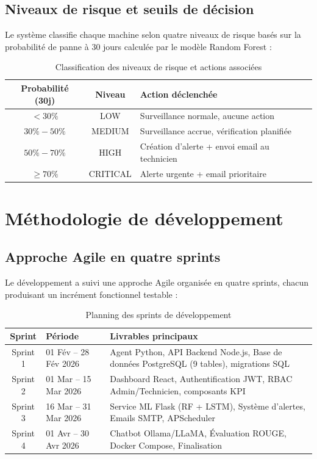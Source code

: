 \subsection{Niveaux de risque et seuils de décision}

Le système classifie chaque machine selon quatre niveaux de risque basés sur la probabilité
de panne à 30 jours calculée par le modèle Random Forest :

\begin{table}[H]
\centering
\caption{Classification des niveaux de risque et actions associées}
\begin{tabularx}{\textwidth}{|c|c|X|}
\hline
\rowcolor{lightblue}
\textbf{Probabilité (30j)} & \textbf{Niveau} & \textbf{Action déclenchée} \\
\hline
$< 30\%$ & LOW & Surveillance normale, aucune action \\
\hline
$30\% - 50\%$ & MEDIUM & Surveillance accrue, vérification planifiée \\
\hline
$50\% - 70\%$ & HIGH & Création d'alerte + envoi email au technicien \\
\hline
$\geq 70\%$ & CRITICAL & Alerte urgente + email prioritaire \\
\hline
\end{tabularx}
\end{table}

\section{Méthodologie de développement}

\subsection{Approche Agile en quatre sprints}

Le développement a suivi une approche Agile organisée en quatre sprints, chacun produisant
un incrément fonctionnel testable :

\begin{table}[H]
\centering
\caption{Planning des sprints de développement}
\begin{tabularx}{\textwidth}{|c|X|X|}
\hline
\rowcolor{lightblue}
\textbf{Sprint} & \textbf{Période} & \textbf{Livrables principaux} \\
\hline
Sprint 1 & 01 Fév -- 28 Fév 2026 & Agent Python, API Backend Node.js, Base de données PostgreSQL (9 tables), migrations SQL \\
\hline
Sprint 2 & 01 Mar -- 15 Mar 2026 & Dashboard React, Authentification JWT, RBAC Admin/Technicien, composants KPI \\
\hline
Sprint 3 & 16 Mar -- 31 Mar 2026 & Service ML Flask (RF + LSTM), Système d'alertes, Emails SMTP, APScheduler \\
\hline
Sprint 4 & 01 Avr -- 30 Avr 2026 & Chatbot Ollama/LLaMA, Évaluation ROUGE, Docker Compose, Finalisation \\
\hline
\end{tabularx}
\end{table}

